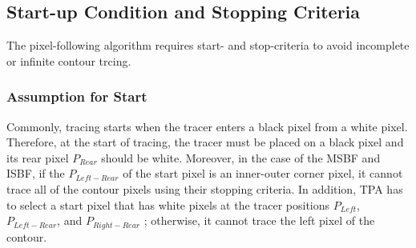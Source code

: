 \subsection{Start-up Condition and Stopping Criteria}

The pixel-following algorithm requires start- and stop-criteria to avoid incomplete or infinite contour trcing.

\subsubsection{Assumption for Start}


Commonly, tracing starts when the tracer enters a black pixel from a white pixel. Therefore, at the start of tracing, the tracer must be placed on a black pixel and its rear pixel $P_{Rear}$ should be white. Moreover, in the case of the MSBF and ISBF, if the $P_{Left-Rear}$ of the start pixel is an inner-outer corner pixel, it cannot trace all of the contour pixels using their stopping criteria\cite{Reddy2012Evaluation,Cheong2012Advanced}. In addition, TPA has to select a start pixel that has white pixels at the tracer positions $P_{Left}$, $P_{Left-Rear}$, and $P_{Right-Rear}$ \cite{Ghuneim2015Contour}; otherwise, it cannot trace the left pixel of the contour. 

